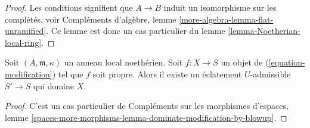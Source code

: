 \begin{proof}
Les conditions signifient que $A \to B$ induit un isomorphisme sur les
complétés, voir
Compléments d'algèbre, lemme \ref{more-algebra-lemma-flat-unramified}.
Ce lemme est donc un cas particulier du
lemme \ref{lemma-Noetherian-local-ring}.
\end{proof}

\begin{lemma}
\label{lemma-dominate-by-admissible-blowup}
Soit $(A, \mathfrak m, \kappa)$ un anneau local noethérien.
Soit $f : X \to S$ un objet de (\ref{equation-modification})
tel que $f$ soit propre.
Alors il existe un éclatement $U$-admissible $S' \to S$
qui domine $X$.
\end{lemma}

\begin{proof}
C'est un cas particulier de Compléments sur les morphismes d'espaces,
lemme \ref{spaces-more-morphisms-lemma-dominate-modification-by-blowup}.
\end{proof}










